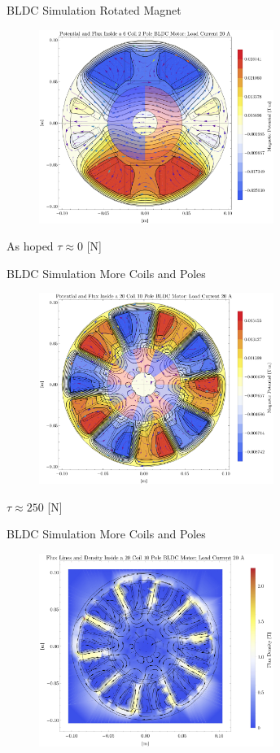 \documentclass{beamer}
\begin{document}
    \begin{frame}{BLDC Simulation}
        Rotated Magnet
        \begin{figure}
            \centering
            \includegraphics[width=3in]{potential-rot90-6coils.pdf}
            \label{fig:my_label}
        \end{figure}
        As hoped $\tau \approx 0$ [N]
    \end{frame}
    
    \begin{frame}{BLDC Simulation}
        More Coils and Poles
        \begin{figure}
            \centering
            \includegraphics[width=3in]{potential-loaded-20coils.pdf}
            \label{fig:my_label}
        \end{figure}
        $\tau\approx 250$ [N]
    \end{frame}
    
    \begin{frame}{BLDC Simulation}
        More Coils and Poles
        \begin{figure}
            \centering
            \includegraphics[width=3in]{flux-loaded-20coils.jpg}
            \label{fig:my_label}
        \end{figure}
    \end{frame}
    
\end{document}
